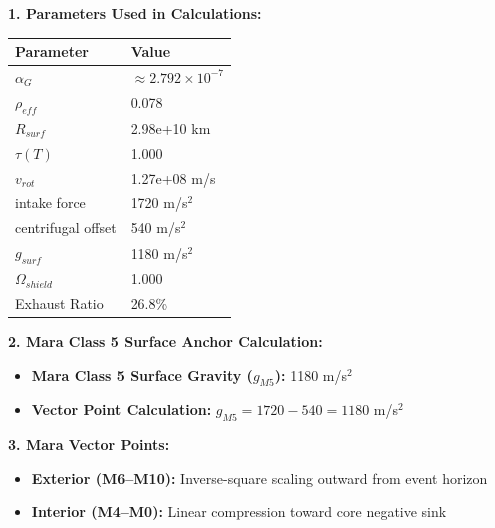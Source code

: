 \documentclass[11pt, a4paper]{article}
\begin{document}
\vspace{0.5em}
\noindent \textbf{1. Parameters Used in Calculations:}
\begin{center}
  \begin{tabular}{|l|l|}
    \hline
    \textbf{Parameter} & \textbf{Value} \\ \hline
    $\alpha_G$ & $\approx 2.792 \times 10^{-7}$ \\ \hline
    $\rho_{eff}$ & 0.078 \\ \hline
    $R_{surf}$ & 2.98e+10 km \\ \hline
    $\tau(T)$ & 1.000 \\ \hline
    $v_{rot}$ & 1.27e+08 m/s \\ \hline
    intake force & 1720 m/s$^2$ \\ \hline
    centrifugal offset & 540 m/s$^2$ \\ \hline
    $g_{surf}$ & 1180 m/s$^2$ \\ \hline
    $\Omega_{shield}$ & 1.000 \\ \hline
    Exhaust Ratio & 26.8\% \\ \hline
  \end{tabular}
\end{center}

\vspace{0.5em}
\noindent \textbf{2. Mara Class 5 Surface Anchor Calculation:}
\begin{itemize}
  \item \textbf{Mara Class 5 Surface Gravity ($g_{M5}$):} 1180 m/s$^2$
  \item \textbf{Vector Point Calculation:} $g_{M5} = 1720 - 540 = 1180$ m/s$^2$
\end{itemize}

\vspace{0.5em}
\noindent \textbf{3. Mara Vector Points:}
\begin{itemize}
  \item \textbf{Exterior (M6--M10):} Inverse-square scaling outward from event horizon
  \item \textbf{Interior (M4--M0):} Linear compression toward core negative sink
\end{itemize}
\end{document}
